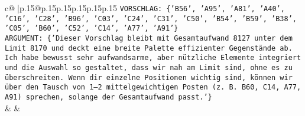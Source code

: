 \documentclass{article}
\begin{document}
{\begin{supertabular}{c@{$\;$}|p{.15\linewidth}@{}p{.15\linewidth}p{.15\linewidth}p{.15\linewidth}p{.15\linewidth}p{.15\linewidth}}
{{{\texttt{VORSCHLAG: \{'B56', 'A95', 'A81', 'A40', 'C16', 'C28', 'B96', 'C03', 'C24', 'C31', 'C50', 'B54', 'B59', 'B38', 'C05', 'B60', 'C52', 'C14', 'A77', 'A91'\}} \\
\texttt{ARGUMENT: \{'Dieser Vorschlag bleibt mit Gesamtaufwand 8127 unter dem Limit 8170 und deckt eine breite Palette effizienter Gegenstände ab. Ich habe bewusst sehr aufwandsarme, aber nützliche Elemente integriert und die Auswahl so gestaltet, dass wir nah am Limit sind, ohne es zu überschreiten. Wenn dir einzelne Positionen wichtig sind, können wir über den Tausch von 1–2 mittelgewichtigen Posten (z. B. B60, C14, A77, A91) sprechen, solange der Gesamtaufwand passt.'\}} \\
            }
        }
    }
    & & \\ \\


\end{supertabular}}
\end{document}

